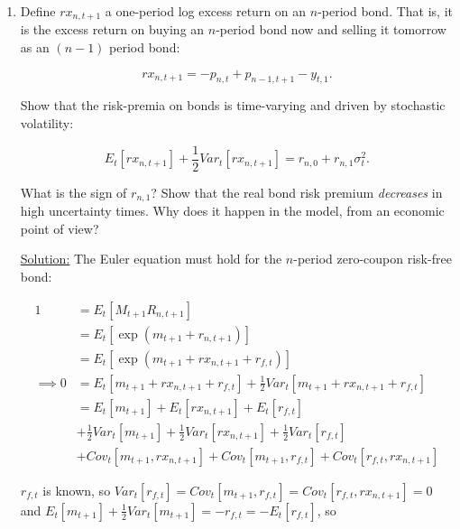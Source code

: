 \documentclass{article}
\begin{document}
\begin{enumerate}
\bigskip

\item Define $rx_{n,t+1}$ a one-period log excess return on an $n$-period bond. That is, it is the excess return on buying an $n$-period bond now and selling it tomorrow as an $(n - 1)$ period bond:

$$
rx_{n,t+1} = -p_{n,t} + p_{n-1,t+1} - y_{t,1}.
$$

Show that the risk-premia on bonds is time-varying and driven by stochastic volatility:

$$
E_t [r x_{n,t+1}] + \frac{1}{2}Var_t [r x_{n,t+1}] = r_{n,0} + r_{n,1} \sigma_t^2.
$$

What is the sign of $r_{n,1}$? Show that the real bond risk premium \textit{decreases} in high uncertainty times. Why does it happen in the model, from an economic point of view?

\bigskip

\underline{Solution:}  The Euler equation must hold for the $n$-period zero-coupon risk-free bond:

\begin{align*}
1 &= E_t [M_{t+1} R_{n,t+1}]\\
  &= E_t [\exp(m_{t+1} + r_{n,t+1})]\\
  &= E_t [\exp(m_{t+1} + rx_{n,t+1} + r_{f,t})]\\
\implies
0 &= E_t[m_{t+1} + rx_{n,t+1} + r_{f,t}] + \frac{1}{2}Var_t[m_{t+1} + rx_{n,t+1} + r_{f,t}]\\
  &= E_t[m_{t+1}] + E_t[rx_{n,t+1}] + E_t[r_{f,t}] \\&+ \frac{1}{2}Var_t[m_{t+1}] + \frac{1}{2}Var_t[rx_{n,t+1}] + \frac{1}{2}Var_t[r_{f,t}] \\&+ Cov_t[m_{t+1}, rx_{n, t+1}] + Cov_t[m_{t+1}, r_{f, t}] + Cov_t[r_{f, t}, rx_{n, t+1}]
\end{align*}

$r_{f,t}$ is known, so $Var_t[r_{f,t}] = Cov_t[m_{t+1}, r_{f, t}] = Cov_t[r_{f, t}, rx_{n, t+1}]=0$ and $E_t[m_{t+1}] + \frac{1}{2} Var_t[m_{t+1}] = - r_{f,t} = -E_t[r_{f,t}]$, so



\end{enumerate}
\end{document}
